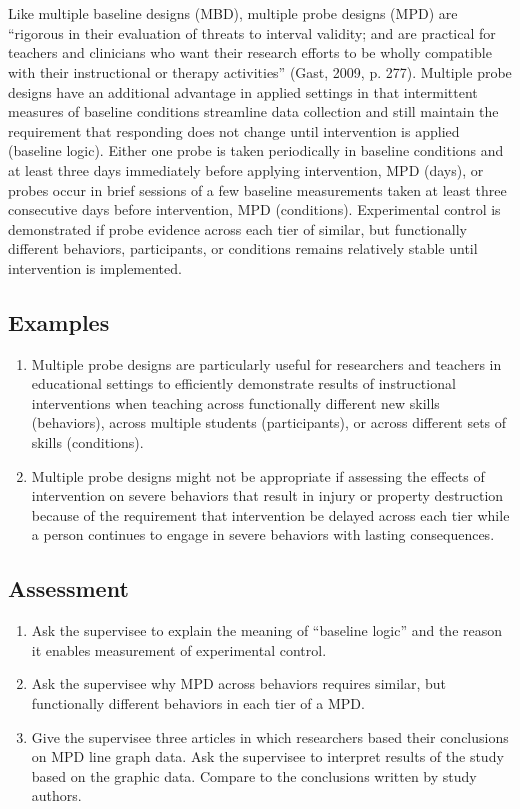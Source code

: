 \clearpage \section{\fourbEight{}}
Like multiple baseline designs (MBD), multiple probe designs (MPD) are ``rigorous in their evaluation of threats to interval validity; and are practical for teachers and clinicians who want their research efforts to be wholly compatible with their instructional or therapy activities'' (Gast, 2009, p. 277). Multiple probe designs have an additional advantage in applied settings in that intermittent measures of baseline conditions streamline data collection and still maintain the requirement that responding does not change until intervention is applied (baseline logic). Either one probe is taken periodically in baseline conditions and at least three days immediately before applying intervention, MPD (days), or probes occur in brief sessions of a few baseline measurements taken at least three consecutive days before intervention, MPD (conditions). Experimental control is demonstrated if probe evidence across each tier of similar, but functionally different behaviors, participants, or conditions remains relatively stable until intervention is implemented. 
%
\subsection{Examples}
\begin{enumerate}
\item Multiple probe designs are particularly useful for researchers and teachers in educational settings to efficiently demonstrate results of instructional interventions when teaching across functionally different new skills (behaviors), across multiple students (participants), or across different sets of skills (conditions).
\item Multiple probe designs might not be appropriate if assessing the effects of intervention on severe behaviors that result in injury or property destruction because of the requirement that intervention be delayed across each tier while a person continues to engage in severe behaviors with lasting consequences.
\end{enumerate}
%
\subsection{Assessment}
\begin{enumerate}
\item Ask the supervisee to explain the meaning of ``baseline logic'' and the reason it enables measurement of experimental control.
\item Ask the supervisee why MPD across behaviors requires similar, but functionally different behaviors in each tier of a MPD.
\item Give the supervisee three articles in which researchers based their conclusions on MPD line graph data. Ask the supervisee to interpret results of the study based on the graphic data. Compare to the conclusions written by study authors.
\end{enumerate}
%
